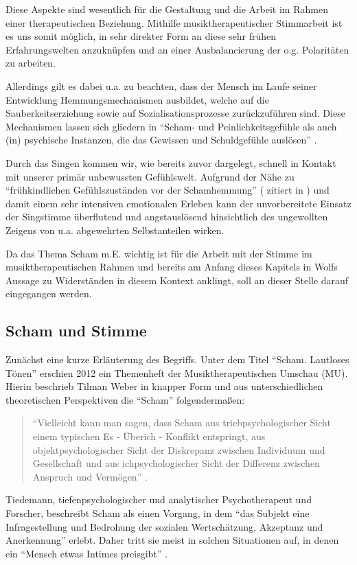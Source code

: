 Diese Aspekte sind wesentlich für die Gestaltung und die Arbeit im Rahmen einer therapeutischen Beziehung. Mithilfe musiktherapeutischer Stimmarbeit ist es uns somit möglich, in sehr direkter Form an diese sehr frühen Erfahrungswelten anzuknüpfen und an einer Ausbalancierung der o.g. Polaritäten zu arbeiten. 

Allerdings gilt es dabei u.a. zu beachten, dass der Mensch im Laufe seiner Entwicklung Hemmungsmechanismen ausbildet, welche auf die Sauberkeitserziehung sowie auf Sozialisationsprozesse zurückzuführen sind. Diese Mechanismen lassen sich gliedern in "`Scham- und Peinlichkeitsgefühle als auch (in) psychische Instanzen, die das Gewissen und Schuldgefühle auslösen"' \autocite [106f.]{rittner1990}. 

Durch das Singen kommen wir, wie bereits zuvor dargelegt, schnell in Kontakt mit unserer primär unbewussten Gefühlswelt. Aufgrund der Nähe zu "`frühkindlichen Gefühlszuständen vor der Schamhemmung"' (\cite{klausmeier1978} zitiert in \cite[107]{rittner1990}) und damit einem sehr intensiven emotionalen Erleben kann der unvorbereitete Einsatz der Singstimme überflutend und angstauslösend hinsichtlich des ungewollten Zeigens von u.a. abgewehrten Selbstanteilen wirken. 

Da das Thema Scham m.E. wichtig ist für die Arbeit mit der Stimme im musiktherapeutischen Rahmen und bereits am Anfang dieses Kapitels in Wolfs Aussage zu Widerständen in diesem Kontext anklingt, soll an dieser Stelle darauf eingegangen werden.

\subsection{Scham und Stimme}
Zunächst eine kurze Erläuterung des Begriffs. Unter dem Titel "`Scham. Lautloses Tönen"' erschien 2012 ein Themenheft der Musiktherapeutischen Umschau (MU). Hierin beschrieb Tilman Weber in knapper Form und aus unterschiedlichen theoretischen Perspektiven die "`Scham"' folgendermaßen:

\begin{quote}
\onehalfspacing
"`Vielleicht kann man sagen, dass Scham aus triebpsychologischer Sicht einem typischen Es - Überich - Konflikt entspringt, aus objektpsychologischer Sicht der Diskrepanz zwischen Individuum und Gesellschaft und aus ichpsychologischer Sicht der Differenz zwischen Anspruch und Vermögen"' \autocite[215]{weber2012}. 
\end{quote}

Tiedemann, tiefenpsychologischer und analytischer Psychotherapeut und Forscher, beschreibt Scham als einen Vorgang, in dem "`das Subjekt eine Infragestellung und Bedrohung der sozialen Wertschätzung, Akzeptanz und Anerkennung"' \autocite[219]{tiedemann2012} erlebt. Daher tritt sie meist in solchen Situationen auf, in denen ein "`Mensch etwas Intimes preisgibt"' \autocite[219]{tiedemann2012}. 

